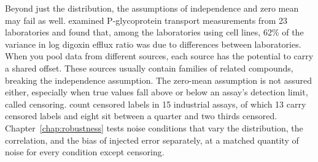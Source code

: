 Beyond just the distribution, the assumptions of independence and zero mean may fail as well. \citet{Bentz2013} examined P-glycoprotein transport measurements from 23 laboratories and found that, among the laboratories using cell lines, 62\% of the variance in log digoxin efflux ratio was due to differences between laboratories. When you pool data from different sources, each source has the potential to carry a shared offset. These sources usually contain families of related compounds, breaking the independence assumption. The zero-mean assumption is not assured either, especially when true values fall above or below an assay's detection limit, called censoring. \citet{Svensson2025} count censored labels in 15 industrial assays, of which 13 carry censored labels and eight sit between a quarter and two thirds censored. Chapter~\ref{chap:robustness} tests noise conditions that vary the distribution, the correlation, and the bias of injected error separately, at a matched quantity of noise for every condition except censoring.

